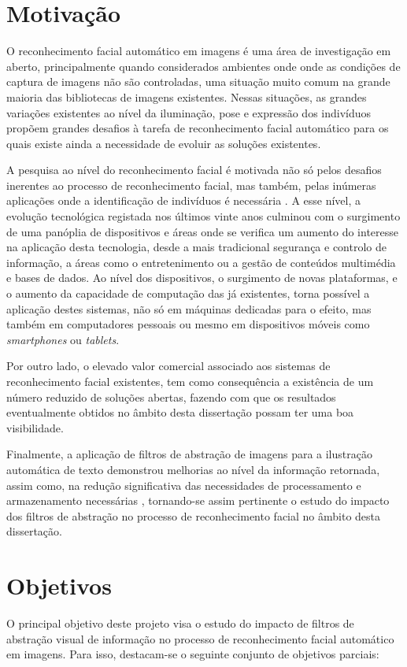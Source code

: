 \section{Motivação} \label{sec:motivation}
O reconhecimento facial automático em imagens é uma área de investigação em aberto, principalmente quando considerados ambientes onde onde as condições de captura de imagens não são controladas, uma situação muito comum na grande maioria das bibliotecas de imagens existentes. Nessas situações, as grandes variações existentes ao nível da iluminação, pose e expressão dos indivíduos propõem grandes desafios à tarefa de reconhecimento facial automático para os quais existe ainda a necessidade de evoluir as soluções existentes.

A pesquisa ao nível do reconhecimento facial é motivada não só pelos desafios inerentes ao processo de reconhecimento facial, mas também, pelas inúmeras aplicações onde a identificação de indivíduos é necessária \citep{Li2011}. A esse nível, a evolução tecnológica registada nos últimos vinte anos culminou com o surgimento de uma panóplia de dispositivos e áreas onde se verifica um aumento do interesse na aplicação desta tecnologia, desde a mais tradicional segurança e controlo de informação, a áreas como o entretenimento ou a gestão de conteúdos multimédia e bases de dados. Ao nível dos dispositivos, o surgimento de novas plataformas, e o aumento da capacidade de computação das já existentes, torna possível a aplicação destes sistemas, não só em máquinas dedicadas para o efeito, mas  também em computadores pessoais ou mesmo em dispositivos móveis como \textit{smartphones} ou \textit{tablets}.

Por outro lado, o elevado valor comercial associado aos sistemas de reconhecimento facial existentes, tem como  consequência a existência de um número reduzido de soluções abertas, fazendo com que os resultados eventualmente obtidos no âmbito desta dissertação possam ter uma boa visibilidade.

Finalmente, a aplicação de filtros de abstração de imagens para a ilustração automática de texto demonstrou melhorias ao  nível da informação retornada, assim como, na redução significativa das necessidades de processamento e armazenamento necessárias \citep{Coelho:2012:IAC:2260641.2260676}, tornando-se assim pertinente o estudo do impacto dos filtros de abstração no processo de reconhecimento facial no âmbito desta dissertação.

\section{Objetivos} \label{sec:objetivosintro}
O principal objetivo deste projeto visa o estudo do impacto de filtros de abstração visual de informação no processo de reconhecimento facial automático em imagens. Para isso, destacam-se o seguinte conjunto de objetivos parciais:

